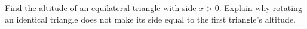 Find the altitude of an equilateral triangle with side $x>0$. Explain why rotating an identical triangle does not make its side equal to the first triangle's altitude.
